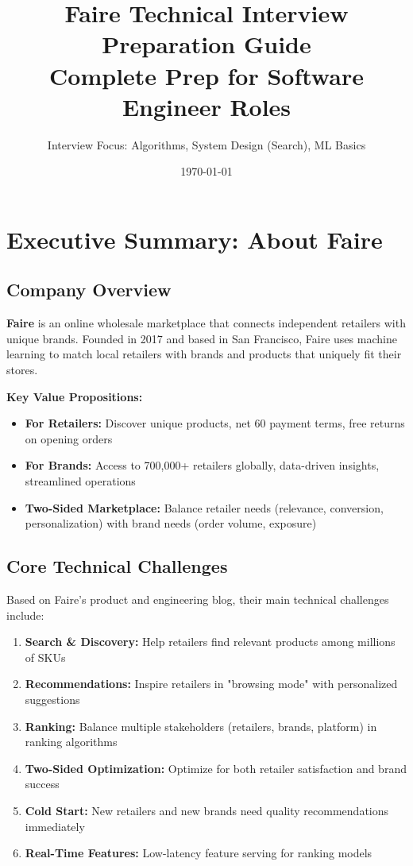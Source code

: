 \documentclass[11pt,letterpaper]{article}
\title{\textbf{Faire Technical Interview Preparation Guide} \\
\large Complete Prep for Software Engineer Roles}
\author{Interview Focus: Algorithms, System Design (Search), ML Basics}
\date{\today}
\begin{document}
\maketitle
\tableofcontents
\newpage

\section{Executive Summary: About Faire}

\subsection{Company Overview}

\textbf{Faire} is an online wholesale marketplace that connects independent retailers with unique brands. Founded in 2017 and based in San Francisco, Faire uses machine learning to match local retailers with brands and products that uniquely fit their stores.

\textbf{Key Value Propositions:}
\begin{itemize}
    \item \textbf{For Retailers:} Discover unique products, net 60 payment terms, free returns on opening orders
    \item \textbf{For Brands:} Access to 700,000+ retailers globally, data-driven insights, streamlined operations
    \item \textbf{Two-Sided Marketplace:} Balance retailer needs (relevance, conversion, personalization) with brand needs (order volume, exposure)
\end{itemize}

\subsection{Core Technical Challenges}

Based on Faire's product and engineering blog, their main technical challenges include:

\begin{enumerate}
    \item \textbf{Search \& Discovery:} Help retailers find relevant products among millions of SKUs
    \item \textbf{Recommendations:} Inspire retailers in "browsing mode" with personalized suggestions
    \item \textbf{Ranking:} Balance multiple stakeholders (retailers, brands, platform) in ranking algorithms
    \item \textbf{Two-Sided Optimization:} Optimize for both retailer satisfaction and brand success
    \item \textbf{Cold Start:} New retailers and new brands need quality recommendations immediately
    \item \textbf{Real-Time Features:} Low-latency feature serving for ranking models
\end{enumerate}
\end{document}
